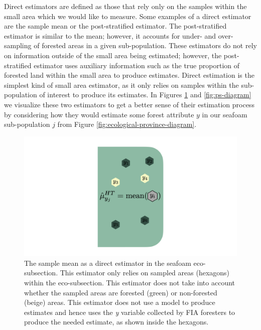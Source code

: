 \documentclass[12pt,twoside]{reedthesis}
\begin{document}
Direct estimators are defined as those that rely only on the samples within the small area which we would like to measure. Some examples of a direct estimator are the sample mean or the post-stratified estimator. The post-stratified estimator is similar to the mean; however, it accounts for under- and over-sampling of forested areas in a given sub-population. These estimators do not rely on information outside of the small area being estimated; however, the post-stratified estimator uses auxiliary information such as the true proportion of forested land within the small area to produce estimates. Direct estimation is the simplest kind of small area estimator, as it only relies on samples within the sub-population of interest to produce its estimates. In Figures \ref{fig:mean-diagram} and \ref{fig:ps-diagram} we visualize these two estimators to get a better sense of their estimation process by considering how they would estimate some forest attribute \(y\) in our seafoam sub-population \(j\) from Figure \ref{fig:ecological-province-diagram}.
\begin{figure}

{\centering \includegraphics[width=1\linewidth]{figure/mean-diagram} 

}

\caption[The sample mean as a direct estimator]{The sample mean as a direct estimator in the seafoam eco-subsection. This estimator only relies on sampled areas (hexagons) within the eco-subsection. This estimator does not take into account whether the sampled areas are forested (green) or non-forested (beige) areas. This estimator does not use a model to produce estimates and hence uses the \textit{y} variable collected by FIA foresters to produce the needed estimate, as shown inside the hexagons.}\label{fig:mean-diagram}
\end{figure}
\end{document}
